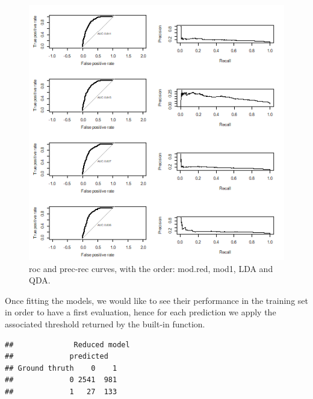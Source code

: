 \documentclass[
]{article}
\newenvironment{Shaded}{\begin{snugshade}}{\end{snugshade}}
\newcommand{\AttributeTok}[1]{\textcolor[rgb]{0.77,0.63,0.00}{#1}}
\newcommand{\DecValTok}[1]{\textcolor[rgb]{0.00,0.00,0.81}{#1}}
\newcommand{\FunctionTok}[1]{\textcolor[rgb]{0.00,0.00,0.00}{#1}}
\newcommand{\NormalTok}[1]{#1}
\newcommand{\OtherTok}[1]{\textcolor[rgb]{0.56,0.35,0.01}{#1}}
\newcommand{\SpecialCharTok}[1]{\textcolor[rgb]{0.00,0.00,0.00}{#1}}
\newcommand{\StringTok}[1]{\textcolor[rgb]{0.31,0.60,0.02}{#1}}
\begin{document}
\begin{figure}
\centering
\includegraphics{curves.png}
\caption{roc and prec-rec curves, with the order: mod.red, mod1, LDA and
QDA.}
\end{figure}

Once fitting the models, we would like to see their performance in the
training set in order to have a first evaluation, hence for each
prediction we apply the associated threshold returned by the built-in
function.

\begin{Shaded}
\end{Shaded}

\begin{verbatim}
##              Reduced model 
##             predicted
## Ground thruth    0    1
##             0 2541  981
##             1   27  133
\end{verbatim}
\end{document}
